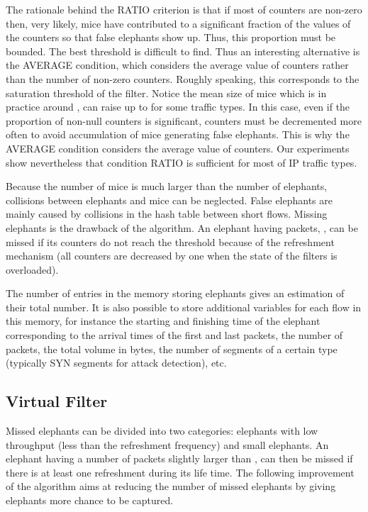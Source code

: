 \documentclass{amsart}
\begin{document}
The rationale behind the RATIO criterion is that if  most of counters are non-zero then, very likely, mice
have contributed  to a significant fraction  of the values  of the counters so  that false
elephants  show up. Thus, this proportion must be bounded. The best
threshold is difficult to  find. Thus an interesting alternative is
the AVERAGE  condition, which considers the average value  of counters rather than  the number of
non-zero counters. Roughly speaking, this corresponds to the saturation threshold
of the filter. 
Notice the mean size of mice which is in practice around , can
raise up to  for some traffic types. In this case, even if the proportion
of non-null counters is significant, counters must be decremented more
often to
avoid accumulation of mice generating false elephants.  This is why
the AVERAGE  condition considers the average value  of counters. Our experiments show  nevertheless that condition RATIO  is sufficient
for most of IP traffic types.

Because the number of mice is much larger than the number of elephants, collisions between
elephants and mice can be neglected.  False elephants are mainly caused by collisions in
the  hash  table  between  short  flows.    Missing  elephants  is  the  drawback  of  the
algorithm. An elephant  having  packets, , can be missed if  its counters do
not  reach the  threshold   because  of  the refreshment  mechanism  (all counters  are
decreased by one when the state of the filters is overloaded).


The number of entries in the memory storing elephants gives an estimation of their total
number. It is also possible to store  additional variables for each flow in this memory,
for instance the starting and finishing time of the elephant corresponding to the arrival
times of the first and last packets, the number of packets, the total volume
in bytes, the number of segments of a certain type (typically SYN segments for attack
detection), etc.  

\subsection{Virtual Filter}

Missed elephants can  be divided into two categories: elephants  with low throughput (less
than  the  refreshment  frequency) and  small  elephants.  An  elephant having a number of
packets slightly larger than ,  can then be missed  if  there  is at least  one
refreshment  during  its  life time.  The  following improvement of the algorithm aims at
reducing  the number of missed elephants by giving  elephants more chance to be
captured.  
\end{document}
